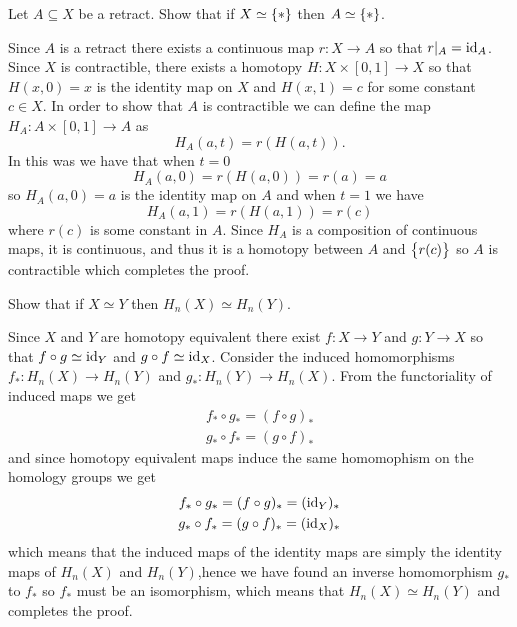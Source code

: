 \documentclass[11pt,a4paper]{article}
\begin{document}
\begin{exercise}
  Let $A \subseteq X$ be a retract.
  Show that if $X \simeq \left\{*\right\}$ then $A \simeq \left\{*\right\}$.
\end{exercise}
\begin{solution}
  Since $A$ is a retract there exists a continuous map
  $r \colon X \to A$ so that $r\vert_A = \operatorname{id}_A$.
  Since $X$ is contractible, there exists a homotopy
  $H \colon X \times [0,1] \to X$ so that
  $H(x,0) = x$ is the identity map on $X$
  and $H(x,1) = c$ for some constant $c \in X$.
  In order to show that $A$ is contractible we can define the map
  $H_A \colon A \times [0,1] \to A$ as
  \[
    H_A(a,t) = r(H(a,t)).
  \]
  In this was we have that when $t = 0$
  \[
    H_A(a,0) =
    r(H(a,0)) =
    r(a) = a
  \]
  so $H_A(a,0) = a$ is the identity map on $A$ and when $t = 1$
  we have
  \[
    H_A(a,1) =
    r(H(a,1)) =
    r(c)
  \]
  where $r(c)$ is some constant in $A$.
  Since $H_A$ is a composition of continuous maps, it is continuous,
  and thus it is a homotopy between $A$ and $\left\{r(c)\right\}$ so
  $A$ is contractible which completes the proof.
\end{solution}

\begin{exercise}
 Show that if $X \simeq Y$ then $H_n(X) \simeq H_n(Y)$.
\end{exercise}
\begin{solution}
  Since $X$ and $Y$ are homotopy equivalent there exist $f \colon X \to Y$
  and $g \colon Y \to X$ so that $f \circ g \simeq \operatorname{id}_Y$ and
  $g \circ f \simeq \operatorname{id}_X$.
  Consider the induced homomorphisms $f_* \colon H_n(X) \to H_n(Y)$
  and $g_* \colon H_n(Y) \to H_n(X)$.
  From the functoriality of induced maps we get
  \begin{gather*}
    f_* \circ g_* = (f \circ g)_* \\
    g_* \circ f_* = (g \circ f)_*
  \end{gather*}
  and since homotopy equivalent maps induce the same
  homomophism on the homology groups we get
  \begin{gather*}
    f_* \circ g_* = (f \circ g)_* = (\operatorname{id}_Y)_* \\
    g_* \circ f_* = (g \circ f)_* = (\operatorname{id}_X)_*
  \end{gather*}
  which means that the induced maps of the identity maps are simply the identity
  maps of $H_n(X)$ and $H_n(Y)$,hence we have found
  an inverse homomorphism $g_*$ to $f_*$ so $f_*$ must be an isomorphism,
  which means that $H_n(X) \simeq H_n(Y)$ and completes the proof.
\end{solution}
\end{document}

